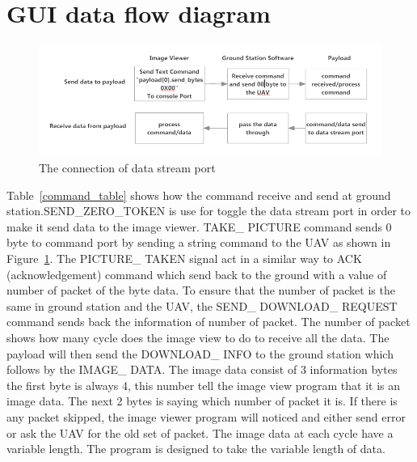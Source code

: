 \section{GUI data flow diagram}

\begin{figure}[H]
\begin{center}
\includegraphics[scale=0.6]{figures/GCS_Payload_communication.PNG} 
\caption{The connection of data stream port\label{GCS_Payload_comm}}
\end{center}
\end{figure}

Table~\ref{command_table} shows how the command receive and send at ground station.SEND\_ZERO\_TOKEN is use for toggle the data stream port in order to make it send data to the image viewer. TAKE\_ PICTURE command sends 0 byte to command port by sending a string command to the UAV as shown in Figure~\ref{GCS_Payload_comm}. The PICTURE\_ TAKEN signal act in a similar way to ACK (acknowledgement) command which send back to the ground with a value of number of packet of the byte data. To ensure that the number of packet is the same in ground station and the UAV, the SEND\_ DOWNLOAD\_ REQUEST command sends back the information of number of packet. The number of packet shows how many cycle does the image view to do to receive all the data.  The payload will then send the DOWNLOAD\_ INFO to the ground station which follows by the IMAGE\_ DATA. The image data consist of 3 information bytes the first byte is always 4, this number tell the image view program that it is an image data. The next 2 bytes is saying which number of packet it is. If there is any packet skipped, the image viewer program will noticed and either send error or ask the UAV for the old set of packet. The image data at each cycle have a variable length. The program is designed to take the variable length of data.

